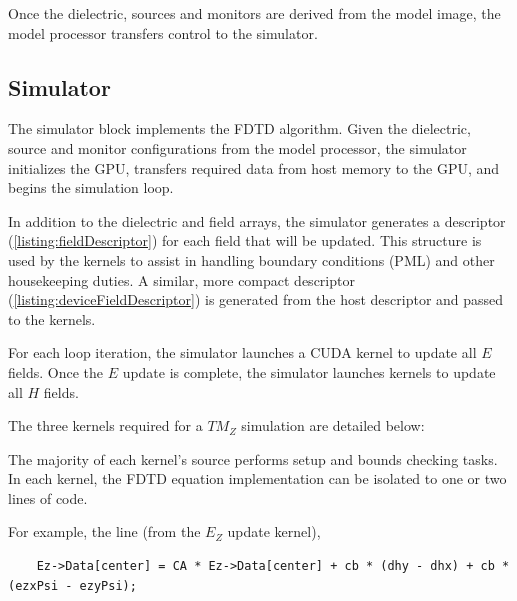 \label{listing:modelFromImage}

Once the dielectric, sources and monitors are derived from the model image, the model processor transfers control to the simulator.

\subsection{Simulator}\label{sec:simulator}

The simulator block implements the FDTD algorithm. Given the dielectric, source and monitor configurations from the model processor, the simulator initializes the GPU, transfers required data from host memory to the GPU, and begins the simulation loop.

In addition to the dielectric and field arrays, the simulator generates a  descriptor (\autoref{listing:fieldDescriptor}) for each field that will be updated. This structure is used by the kernels to assist in handling boundary conditions (PML) and other housekeeping duties. A similar, more compact  descriptor (\autoref{listing:deviceFieldDescriptor}) is generated from the host descriptor and passed to the kernels.

\label{listing:fieldDescriptor}

\label{listing:deviceFieldDescriptor}

For each loop iteration, the simulator launches a CUDA kernel to update all $E$ fields. Once the $E$ update is complete, the simulator launches kernels to update all $H$ fields.

The three kernels required for a $TM_Z$ simulation are detailed below:

\label{listing:updateEzCpp}

The majority of each kernel's source performs setup and bounds checking tasks. In each kernel, the FDTD equation implementation can be isolated to one or two lines of code.

For example, the line (from the $E_Z$ update kernel),

\begin{lstlisting}
	Ez->Data[center] = CA * Ez->Data[center] + cb * (dhy - dhx) + cb * (ezxPsi - ezyPsi);
\end{lstlisting}

